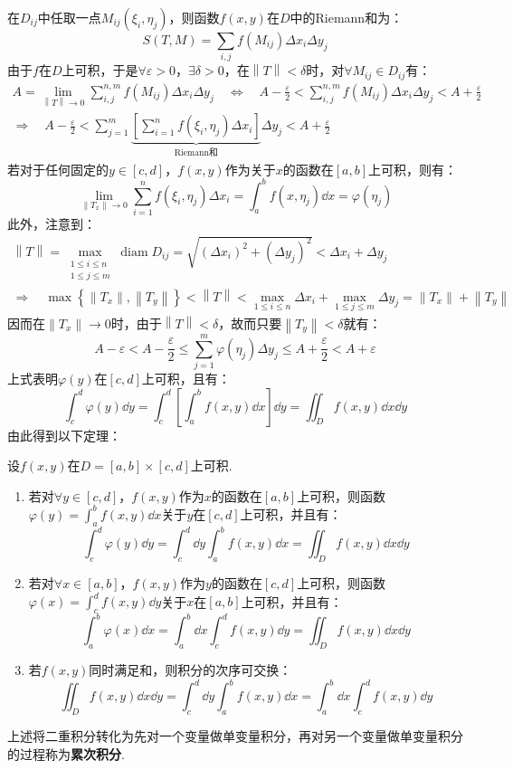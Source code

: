 在$D_{ij}$中任取一点$M_{ij}(\xi_i,\eta_j)$，则函数$f(x,y)$在$D$中的Riemann和为：
\[S(T,M) = \sum_{i,j}f(M_{ij})\Delta x_i \Delta y_j\]
由于$f$在$D$上可积，于是$\forall\varepsilon > 0$，$\exists\delta > 0$，在$\left\|T\right\|<\delta$时，对$\forall M_{ij}\in D_{ij}$有：
\begin{gather*}
    A = \lim_{\left\|T\right\|\to0}\sum_{i,j}^{n,m}f(M_{ij})\Delta x_i \Delta y_j \quad\Leftrightarrow\quad A - \frac{\varepsilon}{2} < \sum_{i,j}^{n,m}f(M_{ij})\Delta x_i \Delta y_j < A + \frac{\varepsilon}{2} \\
    \Rightarrow\quad A-\frac{\varepsilon}{2} < \sum_{j=1}^{m}\underbrace{\left[\sum_{i=1}^{n}f(\xi_i,\eta_j)\Delta x_i\right]}_\text{Riemann和}\Delta y_j < A + \frac{\varepsilon}{2}
\end{gather*}
若对于任何固定的$y \in [c,d]$，$f(x,y)$作为关于$x$的函数在$[a,b]$上可积，则有：
\[\lim_{\left\|T_x\right\|\to0}\sum_{i=1}^{n}f(\xi_i,\eta_j)\Delta x_i = \int_{a}^{b}f(x,\eta_j)\dd{x} = \varphi(\eta_j)\]
此外，注意到：
\begin{gather*}
    \left\|T\right\| = \max_{\substack{1\leqslant i \leqslant n \\ 1\leqslant j \leqslant m}}\operatorname{diam} D_{ij} = \sqrt{(\Delta x_i)^2 + (\Delta y_j)^2} < \Delta x_i + \Delta y_j\\
    \Rightarrow\quad \max\left\{\left\|T_x\right\|,\left\|T_y\right\|\right\} < \left\|T\right\| < \max_{1\leqslant i \leqslant n}\Delta x_i + \max_{1\leqslant j \leqslant m}\Delta y_j = \left\|T_x\right\| + \left\|T_y\right\|
\end{gather*}
因而在$\left\|T_x\right\|\to0$时，由于$\left\|T\right\| < \delta$，故而只要$\left\|T_y\right\|<\delta$就有：
\[A - \varepsilon < A - \frac{\varepsilon}{2} \leqslant \sum_{j=1}^{m}\varphi(\eta_j)\Delta y_j \leqslant A + \frac{\varepsilon}{2} < A + \varepsilon\]
上式表明$\varphi(y)$在$[c,d]$上可积，且有：
\[\int_{c}^{d}\varphi(y)\dd{y} = \int_{c}^{d}\left[\int_{a}^{b} f(x,y) \dd{x}\right]\dd{y} = \iint_D f(x,y)\dd{x}\dd{y}\]
由此得到以下定理：
\begin{theorem}
    设$f(x,y)$在$D = [a,b]\times[c,d]$上可积.
    \begin{enumerate}[circ]
        \item 若对$\forall y \in [c,d]$，$f(x,y)$作为$x$的函数在$[a,b]$上可积，则函数$\varphi(y) = \int_{a}^{b}f(x,y)\dd{x}$关于$y$在$[c,d]$上可积，并且有：
        \[\int_{c}^{d}\varphi(y)\dd{y} = \int_{c}^{d}\dd{y}\int_{a}^{b}f(x,y)\dd{x} = \iint_D f(x,y)\dd{x}\dd{y}\]
        \item 若对$\forall x \in [a,b]$，$f(x,y)$作为$y$的函数在$[c,d]$上可积，则函数$\varphi(x) = \int_{c}^{d}f(x,y)\dd{y}$关于$x$在$[a,b]$上可积，并且有：
        \[\int_{a}^{b}\varphi(x)\dd{x} = \int_{a}^{b}\dd{x}\int_{c}^{d}f(x,y)\dd{y} = \iint_D f(x,y)\dd{x}\dd{y}\]
        \item 若$f(x,y)$同时满足和，则积分的次序可交换：
        \[\iint_D f(x,y)\dd{x}\dd{y} = \int_{c}^{d}\dd{y}\int_{a}^{b}f(x,y)\dd{x} = \int_{a}^{b}\dd{x}\int_{c}^{d}f(x,y)\dd{y}\]
    \end{enumerate}
\end{theorem}
上述将二重积分转化为先对一个变量做单变量积分，再对另一个变量做单变量积分的过程称为\textbf{累次积分}.

